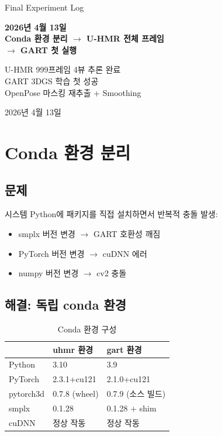 \documentclass[11pt, a4paper]{report}
\begin{document}
\begin{titlepage}
\centering
\vspace*{1.5cm}
{\Large\color{gray} Final Experiment Log}
\vspace{0.5cm}

{\Huge\bfseries\color{defblue} 2026년 4월 13일\\[0.3cm]
Conda 환경 분리 $\rightarrow$ U-HMR 전체 프레임\\[0.3cm]
$\rightarrow$ GART 첫 실행}

\vspace{1cm}

{\LARGE\color{defblue!70!black} U-HMR 999프레임 4뷰 추론 완료\\
GART 3DGS 학습 첫 성공\\
OpenPose 마스킹 재추출 + Smoothing}

\vspace{2cm}
{\large 2026년 4월 13일}
\end{titlepage}

\tableofcontents
\newpage


\chapter{Conda 환경 분리}

\section{문제}
시스템 Python에 패키지를 직접 설치하면서 반복적 충돌 발생:
\begin{itemize}[leftmargin=*]
  \item smplx 버전 변경 $\rightarrow$ GART 호환성 깨짐
  \item PyTorch 버전 변경 $\rightarrow$ cuDNN 에러
  \item numpy 버전 변경 $\rightarrow$ cv2 충돌
\end{itemize}

\section{해결: 독립 conda 환경}

\begin{table}[H]
\centering
\caption{Conda 환경 구성}
\renewcommand{\arraystretch}{1.3}
\begin{tabular}{l p{5cm} p{5cm}}
\toprule
& \textbf{uhmr 환경} & \textbf{gart 환경} \\
\midrule
Python & 3.10 & 3.9 \\
PyTorch & 2.3.1+cu121 & 2.1.0+cu121 \\
pytorch3d & 0.7.8 (wheel) & 0.7.9 (소스 빌드) \\
smplx & 0.1.28 & 0.1.28 + shim \\
cuDNN & 정상 작동 & 정상 작동 \\
\bottomrule
\end{tabular}
\end{table}
\end{document}
